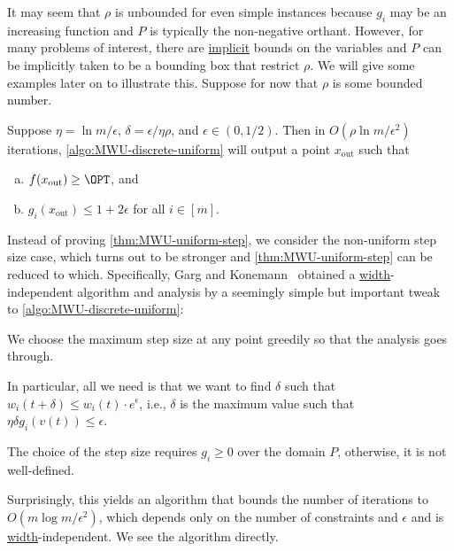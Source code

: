 It may seem that \(\rho \) is unbounded for even simple instances because \(g_i\) may be an increasing function and \(P\) is typically the non-negative orthant. However, for many problems of interest, there are \hyperref[def:implicit-LP]{implicit} bounds on the variables and \(P\) can be implicitly taken to be a bounding box that restrict \(\rho \). We will give some examples later on to illustrate this. Suppose for now that \(\rho \) is some bounded number.

\begin{theorem}\label{thm:MWU-uniform-step}
	Suppose \(\eta = \ln m / \epsilon \), \(\delta = \epsilon / \eta \rho \), and \(\epsilon \in (0, 1 / 2)\). Then in \(O(\rho \ln m / \epsilon ^2)\) iterations, \autoref{algo:MWU-discrete-uniform} will output a point \(x_{\text{out} }\) such that
	\begin{enumerate}[(a)]
		\item \(f(x_{\text{out} }) \geq \OPT\), and
		\item \(g_i(x_{\text{out} }) \leq 1 + 2\epsilon \) for all \(i \in [m]\).
	\end{enumerate}
\end{theorem}

Instead of proving \autoref{thm:MWU-uniform-step}, we consider the non-uniform step size case, which turns out to be stronger and \autoref{thm:MWU-uniform-step} can be reduced to which. Specifically, Garg and Konemann~\cite{garg2007faster} obtained a \hyperref[def:width]{width}-independent algorithm and analysis by a seemingly simple but important tweak to \autoref{algo:MWU-discrete-uniform}:

\begin{intuition}
	We choose the maximum step size at any point greedily so that the analysis goes through.
\end{intuition}

In particular, all we need is that we want to find \(\delta \) such that \(w_i(t + \delta ) \leq w_i(t) \cdot e^{\epsilon } \), i.e., \(\delta \) is the maximum value such that \(\eta \delta g_i(v(t)) \leq \epsilon \).

\begin{note}
	The choice of the step size requires \(g_i \geq 0\) over the domain \(P\), otherwise, it is not well-defined.
\end{note}

Surprisingly, this yields an algorithm that bounds the number of iterations to \(O(m \log m / \epsilon ^2)\), which depends only on the number of constraints and \(\epsilon \) and is \hyperref[def:width]{width}-independent. We see the algorithm directly.

